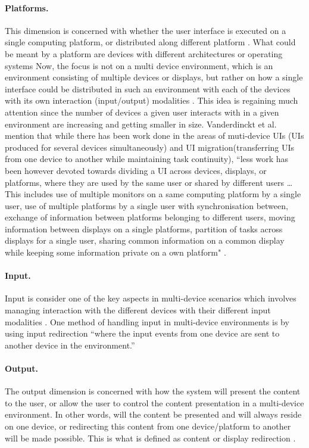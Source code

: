 \paragraph{Platforms.} This dimension is concerned with whether the user
interface is executed on a single computing platform, or distributed along
different platform \cite{elmqvist2011distributed}. What could be meant by a
platform are devices with different architectures or operating systems
Now, the focus is not on a multi device environment, which is an environment
consisting of multiple devices or displays, but rather on how a single interface
could be distributed in such an environment with each of the devices with its
own interaction (input/output) modalities \cite{elmqvist2011distributed}. This
idea is regaining much attention since the number of devices a given user
interacts with in a given environment are increasing and getting smaller in
size.
Vanderdinckt et al. mention that while there has been work done in the areas of
muti-device UIs (UIs produced for several devices simultaneously) and UI
migration(transferring UIs from one device to another while maintaining task
continuity), ``less work has been however devoted towards
dividing a UI across devices, displays, or platforms, where they are used by the
same user or shared by different users \ldots This includes use of
multiple monitors on a same computing platform by a single user, use of
multiple platforms by a single user with synchronisation between, exchange of
information between platforms belonging to different users, moving information
between displays on a single platforms, partition of tasks across displays for a
single user, sharing common information on a common display while keeping some
information private on a own platform" \cite{vanderdonckt2010distributed}.\\

\paragraph{Input.} Input is consider one of the key aspects in
multi-device scenarios which involves managing interaction with the different
devices with their different input modalities \cite{elmqvist2011distributed}.
One method of handling input in multi-device environments is by using input
redirection ``where the input events from one device are sent to another device
in the environment.''\cite{elmqvist2011distributed}

\paragraph{Output.} The output dimension is concerned with how the system will
present the content to the user, or allow the user to control the content
presentation in a multi-device environment. In other words, will the content be
presented and will always reside on one device, or
redirecting this content from one device/platform to another will be made
possible. This is what is defined as content or display redirection
\cite{elmqvist2011distributed}.

